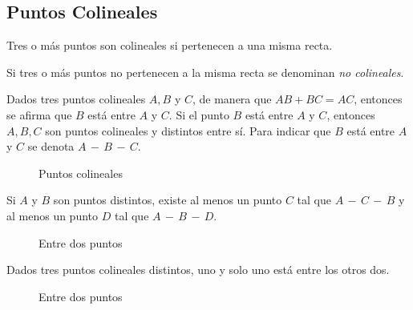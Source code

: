 \clearpage

\subsection{Puntos Colineales}

\begin{definition}
Tres o más puntos son colineales si pertenecen a una misma recta.
\end{definition}

\begin{definition}
Si tres o más puntos no pertenecen a la misma recta se denominan \textit{no colineales}.
\end{definition}

\begin{postulate}
    Dados tres puntos colineales $A,B$ y $C$, de manera que $AB + BC = AC$, entonces se afirma que $B$ está entre $A$ y $C$.  Si el punto $B$ está entre $A$ y $C$, entonces $A,B,C$ son puntos colineales y distintos entre sí. Para indicar que $B$ está entre $A$ y $C$ se denota $A\,-\,B\,-\,C$.
    
    \begin{figure}[!h]
        \centering
        
        \caption{Puntos colineales}
        \label{fig:plot10}
    \end{figure}
\end{postulate}

\begin{postulate}
    Si $A$ y $B$ son puntos distintos, existe al menos un punto $C$ tal que $A\,-\,C\,-\,B$ y al menos un punto $D$ tal que $A\,-\,B\,-\,D$.
    
    \begin{figure}[!h]
        \centering
        
        \label{fig:plot11}
        \caption{Entre dos puntos}
    \end{figure}
\end{postulate}

\begin{postulate}
    Dados tres puntos colineales distintos, uno y solo uno está entre los otros dos.
    
    \begin{figure}[!h]
        \centering
        
        \caption{Entre dos puntos}
        \label{fig:plot12}
    \end{figure}
    
\end{postulate}

